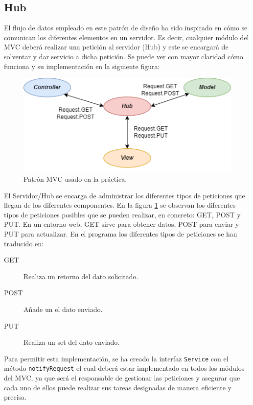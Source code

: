 \subsection{Hub}

El flujo de datos empleado en este patrón de diseño ha sido inspirado en cómo se comunican los diferentes elementos en un servidor. Es decir, cualquier módulo del MVC deberá realizar una petición al servidor (Hub) y este se encargará de solventar y dar servicio a dicha petición. Se puede ver con mayor claridad cómo funciona y su implementación en la siguiente figura:\bigskip

\begin{figure}[!h]
    \centering
    \includegraphics[width=\linewidth]{MVC/img/flujocom.png}
    \caption{Patrón MVC usado en la práctica.}
    \label{fig:flujo_datos}
\end{figure}

El Servidor/Hub se encarga de administrar los diferentes tipos de peticiones que llegan de los diferentes componentes. En la figura \ref{fig:flujo_datos} se observan los diferentes tipos de peticiones posibles que se pueden realizar, en concreto: GET, POST y PUT. En un entorno web, GET sirve para obtener datos, POST para enviar y PUT para actualizar. En el programa los diferentes tipos de peticiones se han traducido en: \medskip

\begin{description}
    \item[GET  ] Realiza un retorno del dato solicitado.
    \item[POST] Añade un el dato enviado.
    \item[PUT  ] Realiza un set del dato enviado.
\end{description}\medskip

Para permitir esta implementación, se ha creado la interfaz \texttt{Service} con el método \texttt{notifyRequest} el cual deberá estar implementado en todos los módulos del MVC, ya que será el responsable de gestionar las peticiones y asegurar que cada uno de ellos puede realizar sus tareas designadas de manera eficiente y precisa.
